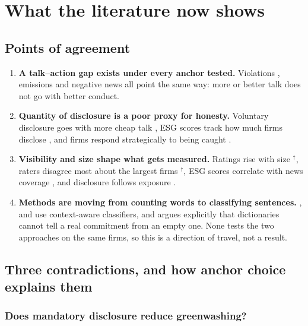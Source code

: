 \documentclass[12pt,a4paper]{article}
\newcommand{\dg}{$^{\dagger}$}          %
\newcommand{\lab}[1]{\textbf{#1}}
\begin{document}
\section{What the literature now shows}
\label{sec:shows}

\subsection{Points of agreement}

\begin{enumerate}
\item \lab{A talk--action gap exists under every anchor tested.} Violations
  \citep{gorovaia2025,raghunandan2022}, emissions \citep{peng2024,raghunandan2022} and negative
  news \citep{bingler2024,boiral2013} all point the same way: more or better talk does not go with
  better conduct.
\item \lab{Quantity of disclosure is a poor proxy for honesty.} Voluntary disclosure goes with
  more cheap talk \citep{bingler2022,bingler2024}, ESG scores track how much firms disclose
  \citep{raghunandan2022}, and firms respond strategically to being caught
  \citep{gorovaia2025,cho2009}.
\item \lab{Visibility and size shape what gets measured.} Ratings rise with size
  \citep{drempetic2020}\dg, raters disagree most about the largest firms
  \citep{gibsonbrandon2021}\dg, ESG scores correlate with news coverage \citep{raghunandan2022},
  and disclosure follows exposure \citep{cho2015}.
\item \lab{Methods are moving from counting words to classifying sentences.}
  \citet{wang2025}, \citet{bingler2022} and \citet{bingler2024} use context-aware classifiers, and
  \citet{wang2025} argues explicitly that dictionaries cannot tell a real commitment from an empty
  one. None tests the two approaches on the same firms, so this is a direction of travel, not a
  result.
\end{enumerate}

\subsection{Three contradictions, and how anchor choice explains them}

\subsubsection{Does mandatory disclosure reduce greenwashing?}
\end{document}
